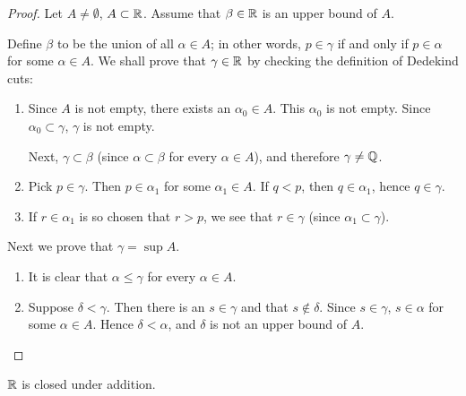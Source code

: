 \begin{proof}
Let $A\neq\emptyset$, $A\subset\mathbb R$. Assume that $\beta\in\mathbb R$ is an upper bound of $A$.

Define $\beta$ to be the union of all $\alpha\in A$; in other words, $p\in\gamma$ if and only if $p\in\alpha$ for some $\alpha\in A$. We shall prove that $\gamma\in\mathbb R$ by checking the definition of Dedekind cuts:
\begin{enumerate}[label=(\arabic*)]
\item Since $A$ is not empty, there exists an $\alpha_0\in A$. This $\alpha_0$ is not empty. Since $\alpha_0\subset\gamma$, $\gamma$ is not empty.

Next, $\gamma\subset\beta$ (since $\alpha\subset\beta$ for every $\alpha\in A$), and therefore $\gamma\neq\mathbb Q$.

\item Pick $p\in\gamma$. Then $p\in\alpha_1$ for some $\alpha_1\in A$. If $q<p$, then $q\in\alpha_1$, hence $q\in\gamma$.

\item If $r\in\alpha_1$ is so chosen that $r>p$, we see that $r\in\gamma$ (since $\alpha_1\subset\gamma$).
\end{enumerate}

Next we prove that $\gamma=\sup A$.
\begin{enumerate}[label=(\arabic*)]
\item It is clear that $\alpha\le\gamma$ for every $\alpha\in A$.
\item Suppose $\delta<\gamma$. Then there is an $s\in\gamma$ and that $s\notin\delta$. Since $s\in\gamma$, $s\in\alpha$ for some $\alpha\in A$. Hence $\delta<\alpha$, and $\delta$ is not an upper bound of $A$.
\end{enumerate}
\end{proof}

\begin{proposition}
$\mathbb R$ is closed under addition.
\end{proposition}

